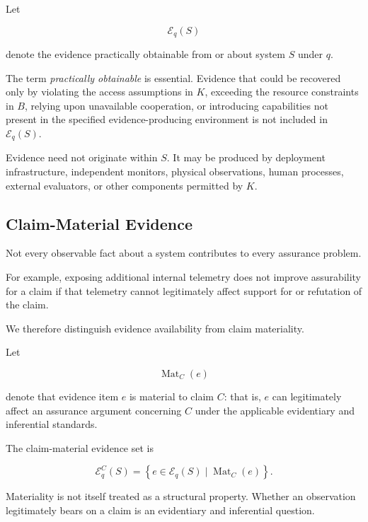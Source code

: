 Let

\begin{equation}
  \mathcal{E}_q(S)
  \label{eq:obtainable-evidence}
\end{equation}

denote the evidence practically obtainable from or about system \(S\) under \(q\).

The term \emph{practically obtainable} is essential.
Evidence that could be recovered only by violating the access assumptions in \(K\), exceeding the resource constraints in \(B\), relying upon unavailable cooperation, or introducing capabilities not present in the specified evidence-producing environment is not included in \(\mathcal{E}_q(S)\).

Evidence need not originate within \(S\).
It may be produced by deployment infrastructure, independent monitors, physical observations, human processes, external evaluators, or other components permitted by \(K\).

\subsection{Claim-Material Evidence}
\label{aa.subsec.claim-material}

Not every observable fact about a system contributes to every assurance problem.

For example, exposing additional internal telemetry does not improve assurability
for a claim if that telemetry cannot legitimately affect support for or refutation of the claim.

We therefore distinguish evidence availability from claim materiality.

Let

\begin{equation}
  \operatorname{Mat}_C(e)
\end{equation}

denote that evidence item \(e\) is material to claim \(C\): that is, \(e\)
can legitimately affect an assurance argument concerning \(C\) under the applicable evidentiary and inferential standards.

The claim-material evidence set is

\begin{equation}
  \mathcal{E}^{C}_q(S)
  =
  \left\{
  e \in \mathcal{E}_q(S)
  \mid
  \operatorname{Mat}_C(e)
  \right\}.
  \label{eq:claim-material-evidence}
\end{equation}

Materiality is not itself treated as a structural property.
Whether an observation legitimately bears on a claim is an evidentiary and inferential question.

